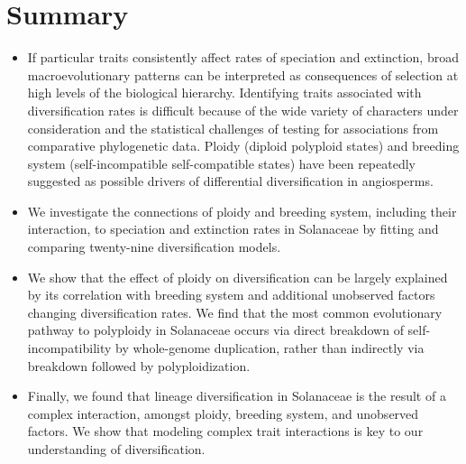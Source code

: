 \section{Summary}

\begin{itemize}
\item If particular traits consistently affect rates of speciation and extinction, broad macroevolutionary patterns can be interpreted as consequences of selection at high levels of the biological hierarchy.
Identifying traits associated with diversification rates is difficult because of the wide variety of characters under consideration and the statistical challenges of testing for associations from comparative phylogenetic data.
Ploidy (diploid \vs polyploid states) and breeding system (self-incompatible \vs self-compatible states) have been repeatedly suggested as possible drivers of differential diversification in angiosperms.

\item  We investigate the connections of ploidy and breeding system, including their interaction, to speciation and extinction rates in Solanaceae by fitting and comparing twenty-nine diversification models.

\item We show that the effect of ploidy on diversification can be largely explained by its correlation with breeding system and additional unobserved factors changing diversification rates.
We find that the most common evolutionary pathway to polyploidy in Solanaceae occurs via direct breakdown of self-incompatibility by whole-genome duplication, rather than indirectly via breakdown followed by polyploidization.

\item Finally, we found that lineage diversification in Solanaceae is the result of a complex interaction, amongst ploidy, breeding system, and unobserved factors. We show that modeling complex trait interactions is key to our understanding of diversification.         
\end{itemize}